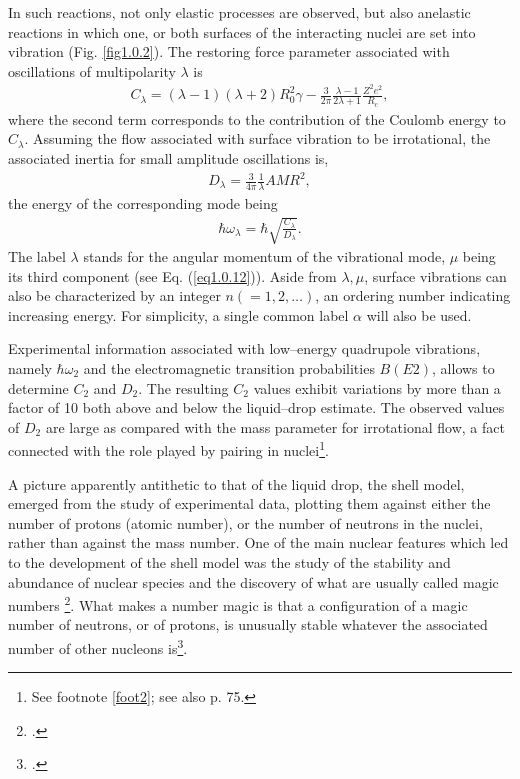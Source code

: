 In such reactions, not only elastic processes are observed, but also anelastic reactions in which one, or both  surfaces of the interacting nuclei are set into vibration (Fig. \ref{fig1.0.2}). The restoring force parameter associated with oscillations of multipolarity $\lambda$ is 
\begin{align}\label{eq1.0.4b}
C_\lambda=(\lambda-1)(\lambda+2)R_0^2\gamma-\frac{3}{2\pi}\frac{\lambda-1}{2\lambda+1}\frac{Z^2e^2}{R_c},
\end{align}
where the second term corresponds to the contribution of the Coulomb energy to $C_\lambda$. Assuming the flow associated with surface vibration to be irrotational, the associated inertia for small amplitude oscillations is, 
\begin{align}\label{eq1.0.5}
D_{\lambda}=\frac{3}{4\pi}\frac{1}{\lambda}AMR^2,
\end{align}
the energy of the corresponding mode being
\begin{align}\label{eq1.0.6}
\hbar\omega_\lambda=\hbar\sqrt{\frac{C_\lambda}{D_\lambda}}.
\end{align}
The label $\lambda$ stands for the angular momentum of the vibrational mode, $\mu$ being its third component (see Eq. (\ref{eq1.0.12})). Aside from $\lambda,\mu$, surface vibrations can also be characterized by an integer $n(=1,2,\dots)$, an ordering number indicating increasing energy. For simplicity, a single common label $\alpha$ will  also be used.


Experimental information associated with low--energy quadrupole vibrations, namely $\hbar\omega_{2}$ and the electromagnetic transition probabilities $B(E2)$, allows to determine $C_2$ and $D_2$. The resulting $C_2$ values exhibit variations by more than a factor of 10 both above and below the liquid--drop estimate. The observed values of $D_2$ are large as compared with the mass parameter for irrotational flow, a fact connected with the role played by pairing in nuclei\footnote{See footnote \ref{foot2}; see also \cite{Bohr:75} p. 75.}.

A picture apparently antithetic to that of the liquid drop, the shell model, emerged from the study of experimental data, plotting them against either the number of protons (atomic number), or the number of neutrons in the nuclei, rather than against the mass number.
One of the main nuclear features which led to the development of the shell model was the study of the stability and abundance of nuclear species and the discovery of what are usually called magic numbers \footnote{\cite{Elsasser:33,Mayer:48,Haxel:49}.}. What makes a number magic is that a configuration of a magic number of neutrons, or of protons, is unusually stable whatever the associated number of other nucleons is\footnote{\cite{Mayer:49,Mayer:49b}.}.


